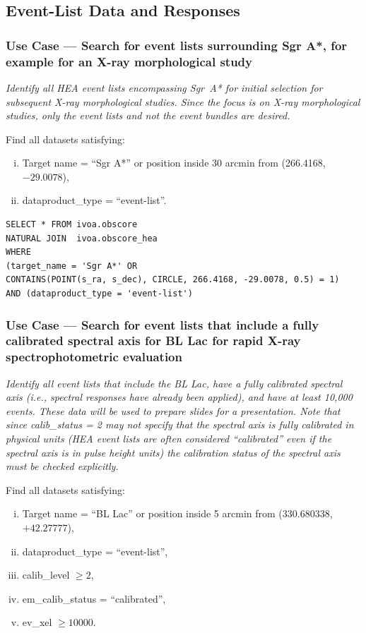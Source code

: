 \subsection{Event-List Data and Responses}


\subsubsection{Use Case --- Search for event lists surrounding Sgr A*, for example for an X-ray morphological study}

{\em Identify all \gls{HEA} event lists encompassing Sgr~A* for initial selection for subsequent X-ray morphological studies.  Since the focus is on X-ray morphological studies, only the event lists and not the event bundles are desired.\/}

\medskip
\noindent Find all datasets satisfying:
\begin{enumerate}[(i)]
  \item Target name = ``Sgr A*'' or position inside 30 arcmin from (266.4168, $-29.0078$),
  \item dataproduct\_type = ``event-list''.
\end{enumerate}

\begin{verbatim}
SELECT * FROM ivoa.obscore
NATURAL JOIN  ivoa.obscore_hea
WHERE
(target_name = 'Sgr A*' OR
CONTAINS(POINT(s_ra, s_dec), CIRCLE, 266.4168, -29.0078, 0.5) = 1)
AND (dataproduct_type = 'event-list')
\end{verbatim}


\subsubsection{Use Case --- Search for event lists that include a fully calibrated spectral axis for BL Lac for rapid X-ray spectrophotometric evaluation}

{\em Identify all event lists that include the BL Lac, have a fully calibrated spectral axis (i.e., spectral responses have already been applied), and have at least 10,000 events.  These data will be used to prepare slides for a presentation.  Note that since calib\_status = 2 may not specify that the spectral axis is fully calibrated in physical units (HEA event lists are often considered ``calibrated'' even if the spectral axis is in pulse height units) the calibration status of the spectral axis must be checked explicitly.\/}

\medskip
\noindent Find all datasets satisfying:
\begin{enumerate}[(i)]
  \item Target name = ``BL Lac'' or position inside 5 arcmin from (330.680338, $+42.27777$),
  \item dataproduct\_type = ``event-list'',
  \item calib\_level $\geq 2$,
  \item em\_calib\_status = ``calibrated'',
  \item ev\_xel $\geq 10000$.
\end{enumerate}

